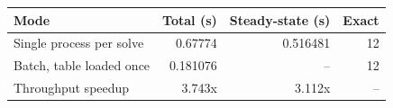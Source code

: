 {\small
\begin{tabular}{lrrr}
\hline
Mode & Total (s) & Steady-state (s) & Exact \\
\hline
Single process per solve & 0.67774 & 0.516481 & 12 \\
Batch, table loaded once & 0.181076 & -- & 12 \\
Throughput speedup & 3.743x & 3.112x & -- \\
\hline
\end{tabular}
}
